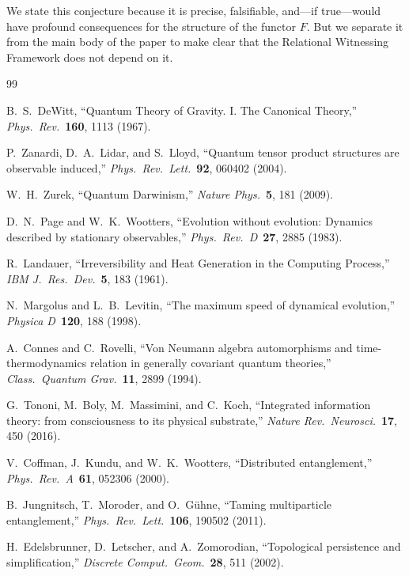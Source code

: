 \documentclass[12pt, a4paper]{article}
\begin{document}
We state this conjecture because it is precise, falsifiable, and---if true---would have profound consequences for the structure of the functor $F$. But we separate it from the main body of the paper to make clear that the Relational Witnessing Framework does not depend on it.

\begin{thebibliography}{99}

B.~S.~DeWitt, ``Quantum Theory of Gravity. I. The Canonical Theory,'' \textit{Phys.\ Rev.}\ \textbf{160}, 1113 (1967).

P.~Zanardi, D.~A.~Lidar, and S.~Lloyd, ``Quantum tensor product structures are observable induced,'' \textit{Phys.\ Rev.\ Lett.}\ \textbf{92}, 060402 (2004).

W.~H.~Zurek, ``Quantum Darwinism,'' \textit{Nature Phys.}\ \textbf{5}, 181 (2009).

D.~N.~Page and W.~K.~Wootters, ``Evolution without evolution: Dynamics described by stationary observables,'' \textit{Phys.\ Rev.\ D}\ \textbf{27}, 2885 (1983).

R.~Landauer, ``Irreversibility and Heat Generation in the Computing Process,'' \textit{IBM J.\ Res.\ Dev.}\ \textbf{5}, 183 (1961).

N.~Margolus and L.~B.~Levitin, ``The maximum speed of dynamical evolution,'' \textit{Physica D}\ \textbf{120}, 188 (1998).

A.~Connes and C.~Rovelli, ``Von Neumann algebra automorphisms and time-thermodynamics relation in generally covariant quantum theories,'' \textit{Class.\ Quantum Grav.}\ \textbf{11}, 2899 (1994).

G.~Tononi, M.~Boly, M.~Massimini, and C.~Koch, ``Integrated information theory: from consciousness to its physical substrate,'' \textit{Nature Rev.\ Neurosci.}\ \textbf{17}, 450 (2016).

V.~Coffman, J.~Kundu, and W.~K.~Wootters, ``Distributed entanglement,'' \textit{Phys.\ Rev.\ A}\ \textbf{61}, 052306 (2000).

B.~Jungnitsch, T.~Moroder, and O.~G\"{u}hne, ``Taming multiparticle entanglement,'' \textit{Phys.\ Rev.\ Lett.}\ \textbf{106}, 190502 (2011).

H.~Edelsbrunner, D.~Letscher, and A.~Zomorodian, ``Topological persistence and simplification,'' \textit{Discrete Comput.\ Geom.}\ \textbf{28}, 511 (2002).


\end{thebibliography}
\end{document}
